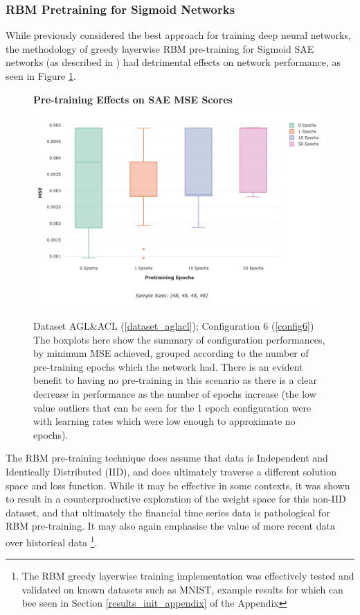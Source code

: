 \documentclass[a4paper,11pt,oneside]{article}
\theoremstyle{plain}
\theoremstyle{definition}
\begin{document}
	\subsubsection{RBM Pretraining for Sigmoid Networks}
	
	While previously considered the best approach for training deep neural networks, the methodology of greedy layerwise RBM pre-training for Sigmoid SAE networks (as described in \cite{Hinton2}) had detrimental effects on network performance, as seen in Figure \ref{figure-results-pretraining-effect}. \newline
	
	\begin{figure}[H]
		\centering
		\textbf{Pre-training Effects on SAE MSE Scores} 
		\includegraphics[scale=0.45]{images/results/newinit/actual_sigmoid_pt.png}
		\caption[Pre-training Effects on SAE MSE Scores]
		{Dataset AGL\&ACL (\ref{dataset_aglacl}); Configuration 6 (\ref{config6})
			\newline \newline The boxplots here show the summary of configuration performances, by minimum MSE achieved, grouped according to the number of pre-training epochs which the network had. There is an evident benefit to having no pre-training in this scenario as there is a clear decrease in performance as the number of epochs increase (the low value outliers that can be seen for the 1 epoch configuration were with learning rates which were low enough to approximate no epochs).}
		\label{figure-results-pretraining-effect}
	\end{figure}		
	
	The RBM pre-training technique does assume that data is Independent and Identically Distributed (IID), and does ultimately traverse a different solution space and loss function. While it may be effective in some contexts, it was shown to result in a counterproductive exploration of the weight space for this non-IID dataset, and that ultimately the financial time series data is pathological for RBM pre-training. It may also again emphasise the value of more recent data over historical data \footnote{The RBM greedy layerwise training implementation was effectively tested and validated on known datasets such as MNIST, example results for which can bee seen in Section \ref{results_init_appendix} of the Appendix}.\newline 
	
\end{document}
